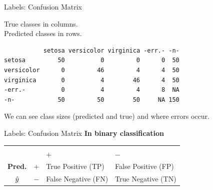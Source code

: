 \documentclass[11pt,compress,t,notes=noshow, xcolor=table]{beamer}
\makeatletter
\newenvironment{kframe}{%
 \def\at@end@of@kframe{}%
 \ifinner\ifhmode%
  \def\at@end@of@kframe{\end{minipage}}%
  \begin{minipage}{\columnwidth}%
 \fi\fi%
 \def\FrameCommand##1{\hskip\@totalleftmargin \hskip-\fboxsep
 \colorbox{shadecolor}{##1}\hskip-\fboxsep
     \hskip-\linewidth \hskip-\@totalleftmargin \hskip\columnwidth}%
 \MakeFramed {\advance\hsize-\width
   \@totalleftmargin\z@ \linewidth\hsize
   \@setminipage}}%
 {\par\unskip\endMakeFramed%
 \at@end@of@kframe}
\newenvironment{knitrout}{}{} %
\makeatother
\begin{document}
\begin{vbframe}{Labels: Confusion Matrix}

True classes in columns.\\
Predicted classes in rows.\\

\lz

\begin{knitrout}\scriptsize
{}\color{fgcolor}\begin{kframe}
\begin{verbatim}
           setosa versicolor virginica -err.- -n-
setosa         50          0         0      0  50
versicolor      0         46         4      4  50
virginica       0          4        46      4  50
-err.-          0          4         4      8  NA
-n-            50         50        50     NA 150
\end{verbatim}
\end{kframe}
\end{knitrout}

\lz
We can see class sizes (predicted and true) and where errors occur.
\end{vbframe}



\begin{vbframe}{Labels: Confusion Matrix}
\textbf{In binary classification}

\begin{center}
\small
\begin{tabular}{cc|>{\centering\arraybackslash}p{7em}>{\centering\arraybackslash}p{8em}}
    & & \multicolumn{2}{c}{\bfseries True Class $y$} \\
    & & $+$ & $-$ \\
    \hline
    \bfseries Pred.     & $+$ & True Positive (TP)  & False Positive (FP) \\
              $\hat{y}$ & $-$ & False Negative (FN) & True Negative (TN) \\
\end{tabular}
\end{center}

\end{vbframe}
\end{document}
